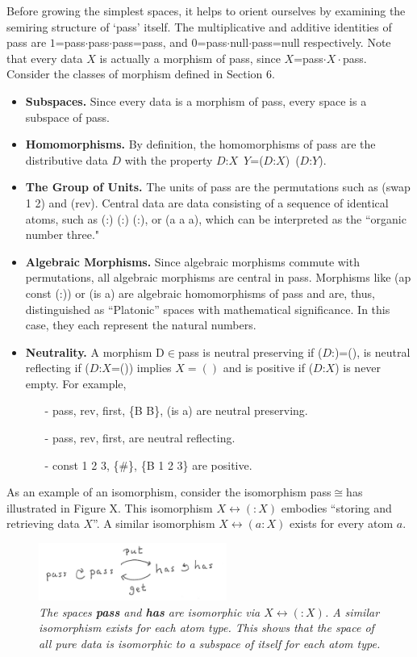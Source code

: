 \documentclass[11pt]{article}
\begin{document}
Before growing the simplest spaces, it helps to orient ourselves by examining the semiring structure of `pass' itself.  The multiplicative and 
additive identities of pass are $1$=pass$\cdot$pass$\cdot$pass=pass, and $0$=pass$\cdot$null$\cdot$pass=null respectively.  Note that every data 
$X$ is actually a morphism of pass, since $X$=pass$\cdot X\cdot$pass.  Consider the classes of morphism defined in Section 6. 
\begin{itemize}
\item{{\bf Subspaces.}  Since every data is a morphism of pass, every space is a subspace of pass.}
\item{{\bf Homomorphisms.} By definition, the homomorphisms of pass are the distributive data $D$ with the property $D$:$X$\ $Y$=($D$:$X$)\ ($D$:$Y$).}
\item{{\bf The Group of Units.} The units of pass are the permutations such as (swap 1 2) and (rev).  Central data are data consisting of a sequence of 
identical atoms, such as (:) (:) (:), or (a a a), which can be interpreted as the ``organic number three."}
\item{{\bf Algebraic Morphisms.} Since algebraic morphisms commute with permutations, all algebraic morphisms are central in pass. 
Morphisms like (ap const (:)) or (is a) are algebraic homomorphisms of pass and are, thus, distinguished as ``Platonic'' spaces with
mathematical significance.  In this case, they each represent the natural numbers.}
\item{{\bf Neutrality.} A morphism D$\in$pass is neutral preserving if ($D$:)=(), is neutral reflecting if ($D$:$X$=()) implies $X=()$ 
and is positive if ($D$:$X$) is never empty.  For example,
\begin{itemize}
\item[-] pass, rev, first, \{B B\}, (is a) are neutral preserving.
\item[-] pass, rev, first, are neutral reflecting.
\item[-] const 1 2 3, \{\#\}, \{B 1 2 3\} are positive. 
\end{itemize}
}
\end{itemize}

As an example of an isomorphism, consider the isomorphism pass$\cong$has illustrated in Figure X.  This isomorphism $X\leftrightarrow(:X)$ embodies 
``storing and retrieving data $X$''.  A similar isomorphism $X\leftrightarrow(a:X)$ exists for every atom $a$.   

\begin{figure}[h]
\centering
\includegraphics[width=0.55\textwidth]{has.png}
\caption{{\it The spaces {\bf pass} and {\bf has} are isomorphic via $X\leftrightarrow (:X)$.  A similar isomorphism exists for each atom type.  This shows that the space of all pure data 
is isomorphic to a subspace of itself for each atom type.}}
\end{figure}
\end{document}
